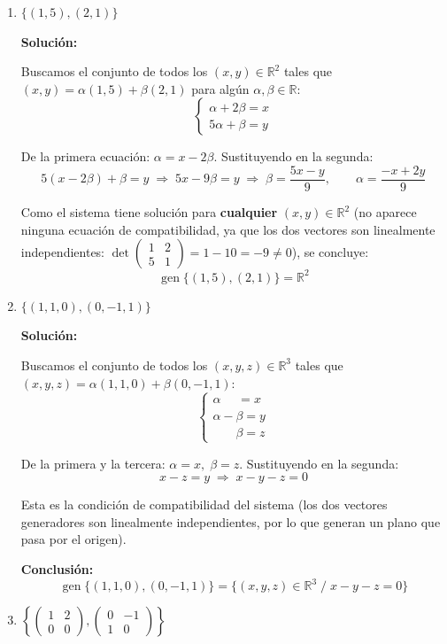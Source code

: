 \documentclass[12pt]{article}
\newcommand{\solucion}{%
    \vspace{0.8em}%
    \textbf{Solución:}%
    \vspace{0.8em}%
}
\begin{document}
\begin{enumerate}[label=\alph*.-]
    \item $\{(1,5),(2,1)\}$

    \solucion

    Buscamos el conjunto de todos los $(x,y)\in\mathbb{R}^2$ tales que $(x,y)=\alpha(1,5)+\beta(2,1)$ para algún $\alpha,\beta\in\mathbb{R}$:
    \[
    \begin{cases}
    \alpha+2\beta=x \\
    5\alpha+\beta=y
    \end{cases}
    \]

    De la primera ecuación: $\alpha=x-2\beta$. Sustituyendo en la segunda:
    \[
    5(x-2\beta)+\beta=y \;\Longrightarrow\; 5x-9\beta=y \;\Longrightarrow\; \beta=\frac{5x-y}{9}, \qquad \alpha=\frac{-x+2y}{9}
    \]

    Como el sistema tiene solución para \textbf{cualquier} $(x,y)\in\mathbb{R}^2$ (no aparece ninguna ecuación de compatibilidad, ya que los dos vectores son linealmente independientes: $\det\begin{pmatrix}1&2\\5&1\end{pmatrix}=1-10=-9\neq0$), se concluye:
    \[
    \operatorname{gen}\{(1,5),(2,1)\} = \mathbb{R}^2
    \]

    \item $\{(1,1,0),(0,-1,1)\}$

    \solucion

    Buscamos el conjunto de todos los $(x,y,z)\in\mathbb{R}^3$ tales que $(x,y,z)=\alpha(1,1,0)+\beta(0,-1,1)$:
    \[
    \begin{cases}
    \alpha \phantom{-\beta} = x \\
    \alpha-\beta = y \\
    \phantom{\alpha-}\beta = z
    \end{cases}
    \]

    De la primera y la tercera: $\alpha=x,\; \beta=z$. Sustituyendo en la segunda:
    \[
    x-z=y \;\Longrightarrow\; x-y-z=0
    \]

    Esta es la condición de compatibilidad del sistema (los dos vectores generadores son linealmente independientes, por lo que generan un plano que pasa por el origen).

    \textbf{Conclusión:}
    \[
    \operatorname{gen}\{(1,1,0),(0,-1,1)\} = \{(x,y,z)\in\mathbb{R}^3 \; / \; x-y-z=0\}
    \]

    \item $\left\{ \begin{pmatrix} 1 & 2 \\ 0 & 0 \end{pmatrix}, \begin{pmatrix} 0 & -1 \\ 1 & 0 \end{pmatrix} \right\}$


\end{enumerate}
\end{document}
